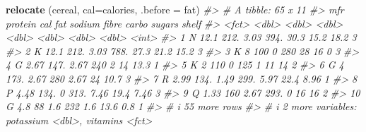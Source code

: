 \documentclass[
]{book}
\newenvironment{Shaded}{\begin{snugshade}}{\end{snugshade}}
\newcommand{\AttributeTok}[1]{\textcolor[rgb]{0.13,0.29,0.53}{#1}}
\newcommand{\CommentTok}[1]{\textcolor[rgb]{0.56,0.35,0.01}{\textit{#1}}}
\newcommand{\FunctionTok}[1]{\textcolor[rgb]{0.13,0.29,0.53}{\textbf{#1}}}
\newcommand{\NormalTok}[1]{#1}
\begin{document}
\begin{Shaded}
\begin{Highlighting}[]
\FunctionTok{relocate}\NormalTok{ (cereal, }\AttributeTok{cal=}\NormalTok{calories, }\AttributeTok{.before =}\NormalTok{ fat)}
\CommentTok{\#\textgreater{} \# A tibble: 65 x 11}
\CommentTok{\#\textgreater{}    mfr   protein   cal   fat sodium fibre carbo sugars shelf}
\CommentTok{\#\textgreater{}    \textless{}fct\textgreater{}   \textless{}dbl\textgreater{} \textless{}dbl\textgreater{} \textless{}dbl\textgreater{}  \textless{}dbl\textgreater{} \textless{}dbl\textgreater{} \textless{}dbl\textgreater{}  \textless{}dbl\textgreater{} \textless{}int\textgreater{}}
\CommentTok{\#\textgreater{}  1 N       12.1   212.  3.03   394. 30.3   15.2  18.2      3}
\CommentTok{\#\textgreater{}  2 K       12.1   212.  3.03   788. 27.3   21.2  15.2      3}
\CommentTok{\#\textgreater{}  3 K        8     100   0      280  28     16     0        3}
\CommentTok{\#\textgreater{}  4 G        2.67  147.  2.67   240   2     14    13.3      1}
\CommentTok{\#\textgreater{}  5 K        2     110   0      125   1     11    14        2}
\CommentTok{\#\textgreater{}  6 G        4     173.  2.67   280   2.67  24    10.7      3}
\CommentTok{\#\textgreater{}  7 R        2.99  134.  1.49   299.  5.97  22.4   8.96     1}
\CommentTok{\#\textgreater{}  8 P        4.48  134.  0      313.  7.46  19.4   7.46     3}
\CommentTok{\#\textgreater{}  9 Q        1.33  160   2.67   293.  0     16    16        2}
\CommentTok{\#\textgreater{} 10 G        4.8    88   1.6    232   1.6   13.6   0.8      1}
\CommentTok{\#\textgreater{} \# i 55 more rows}
\CommentTok{\#\textgreater{} \# i 2 more variables: potassium \textless{}dbl\textgreater{}, vitamins \textless{}fct\textgreater{}}


\end{Highlighting}
\end{Shaded}
\end{document}

